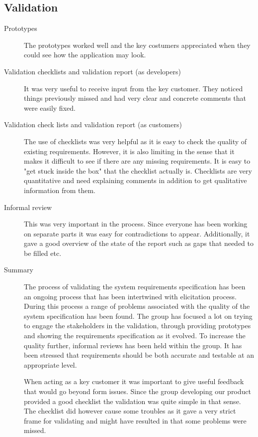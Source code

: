\documentclass[10pt,a4paper]{article}
\begin{document}
\subsection{Validation}
\begin{description}
\item[Prototypes] The prototypes worked well and the key costumers appreciated when they could see how the application may look.

\item[Validation checklists and validation report (as developers)] It was very useful to receive input from the key customer. They noticed things previously missed and had very clear and concrete comments that were easily fixed. 


\item[Validation check lists and validation report (as customers)] The use of checklists was very helpful as it is easy to check the quality of existing requirements. However, it is also limiting in the sense that it makes it difficult to see if there are any missing requirements. It is easy to "get stuck inside the box" that the checklist actually is. Checklists are very quantitative and need explaining comments in addition to get qualitative information from them.

\item[Informal review] This was very important in the process. Since everyone has been working on separate parts it was easy for contradictions to appear. Additionally, it gave a good overview of the state of the report such as gaps that needed to be filled etc.

\item[Summary] The process of validating the system requirements specification has been an ongoing process that has been intertwined with elicitation process. During this process a range of problems associated with the quality of the system specification has been found. The group has focused a lot on trying to engage the stakeholders in the validation, through providing prototypes and showing the requirements specification as it evolved. To increase the quality further, informal reviews has been held within the group. It has been stressed that requirements should be both accurate and testable at an appropriate level.

When acting as a key customer it was important to give useful feedback that would go beyond form issues. Since the group developing our product provided a good checklist the validation was quite simple in that sense. The checklist did however cause some troubles as it gave a very strict frame for validating and might have resulted in that some problems were missed.


\end{description}
\end{document}
